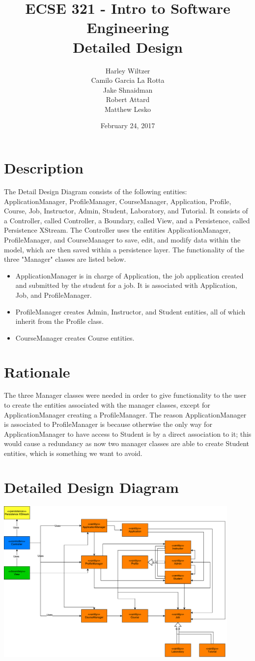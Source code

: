 \documentclass[12pt]{article}
\title{ECSE 321 - Intro to Software Engineering\\Detailed Design}
\author{Harley Wiltzer\\Camilo Garcia La Rotta\\Jake Shnaidman\\Robert Attard\\Matthew Lesko}
\date{February 24, 2017}
\begin{document}
\maketitle
\newpage
{} %
\tableofcontents
\section{Description}
The Detail Design Diagram consists of the following entities: ApplicationManager, ProfileManager, CourseManager, Application, Profile, Course, Job, Instructor, Admin, Student, Laboratory, and Tutorial. It consists of a Controller, called Controller, a Boundary, called View, and a Persistence, called Persistence XStream. The Controller uses the entities ApplicationManager, ProfileManager, and CourseManager to save, edit, and modify data within the model, which are then saved within a persistence layer. The functionality of the three "Manager" classes are listed below.
\begin{itemize}
	\item ApplicationManager is in charge of Application, the job application created and submitted by the student for a job. It is associated with Application, Job, and ProfileManager.
	\item ProfileManager creates Admin, Instructor, and Student entities, all of which inherit from the Profile class.
	\item CourseManager creates Course entities.
\end{itemize}
\section{Rationale}
The three Manager classes were needed in order to give functionality to the user to create the entities associated with the manager classes, except for ApplicationManager creating a ProfileManager. The reason ApplicationManager is associated to ProfileManager is because otherwise the only way for ApplicationManager to have access to Student is by a direct association to it; this would cause a redundancy as now two manager classes are able to create Student entities, which is something we want to avoid.
\section{Detailed Design Diagram}
\centering
\includegraphics[width =0.9\textwidth]{DetailedDesignDiagram.pdf}
\end{document}

